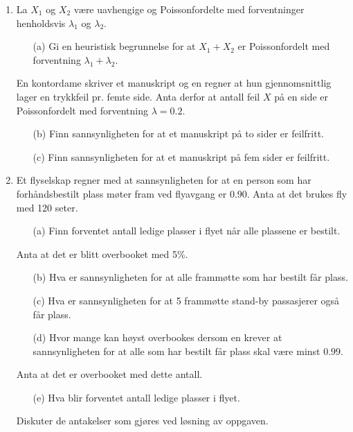 \begin{enumerate}
\item La $X_1$ og $X_2$ være uavhengige og Poissonfordelte med
     forventninger henholdsvis $\lambda _1$ og $\lambda _2$.
     \begin{itemize}
     \item[(a)]  Gi en heuristisk begrunnelse for at $X_1+X_2$ er
          Poissonfordelt med forventning ${\lambda}_1+{\lambda}_2$.
     \end{itemize}
     En kontordame skriver et manuskript og en regner at hun
     gjennomsnittlig lager en trykkfeil pr. femte side. Anta
     derfor at antall feil $X$ på en side er Poissonfordelt med
     forventning $\lambda =0.2$.
     \begin{itemize}
     \item[(b)]  Finn sannsynligheten for at et manuskript på to sider
          er feilfritt.

     \item[(c)]  Finn sannsynligheten for at et manuskript på fem sider
          er feilfritt.
     \end{itemize}

\item Et flyselskap regner med at sannsynligheten for at en person
     som har forhåndsbestilt plass møter fram ved flyavgang er
     $0.90$. Anta at det brukes fly med 120 seter.
     \begin{itemize}
     \item[(a)]  Finn forventet antall ledige plasser i flyet når alle
          plassene er bestilt.
     \end{itemize}
     Anta at det er blitt overbooket med 5\%.
     \begin{itemize}
     \item[(b)]  Hva er sannsynligheten for at alle frammøtte som har
          bestilt får plass.
     \item[(c)]  Hva er sannsynligheten for at 5 frammøtte stand-by
          passasjerer også får plass.
     \item[(d)]  Hvor mange kan høyst overbookes dersom en krever at
          sannsynligheten for at alle som har bestilt får
          plass skal være minst $0.99$.
     \end{itemize}
     Anta at det er overbooket med dette antall.
     \begin{itemize}
     \item[(e)]  Hva blir forventet antall ledige plasser i flyet.
     \end{itemize}
     Diskuter de antakelser som gjøres ved løsning av oppgaven.



\end{enumerate}
